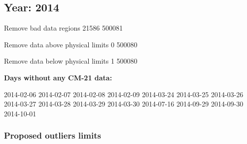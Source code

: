 \documentclass[
  10pt,
  a4paper,oneside]{article}
\begin{document}
\FloatBarrier

\newpage

\hypertarget{year-2014}{%
\subsection{Year: 2014}\label{year-2014}}

Remove bad data regions
21586 500081

Remove data above physical limits
0 500080

Remove data below physical limits
1 500080

\textbf{Days without any CM-21 data:}

2014-02-06 2014-02-07 2014-02-08 2014-02-09 2014-03-24 2014-03-25 2014-03-26 2014-03-27 2014-03-28 2014-03-29 2014-03-30 2014-07-16 2014-09-29 2014-09-30 2014-10-01

\hypertarget{proposed-outliers-limits-21}{%
\subsubsection{Proposed outliers limits}\label{proposed-outliers-limits-21}}

\footnotesize
\end{document}
